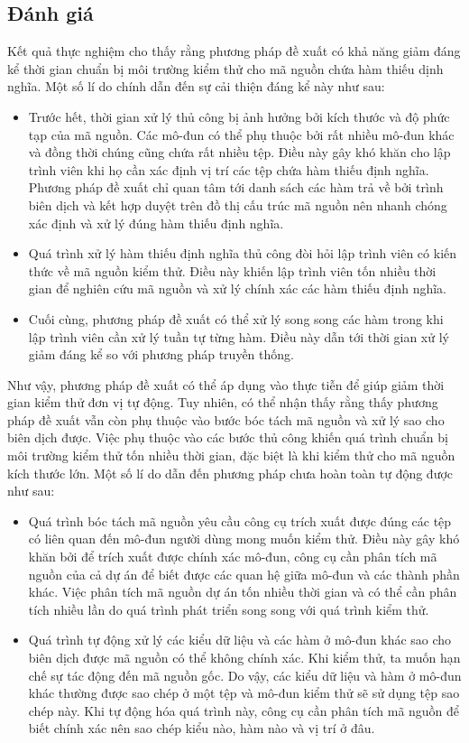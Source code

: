 \subsection{Đánh giá}
Kết quả thực nghiệm cho thấy rằng phương pháp đề xuất có khả năng giảm đáng kể thời gian chuẩn bị môi trường kiểm thử cho mã nguồn chứa hàm thiếu dịnh nghĩa. Một số lí do chính dẫn đến sự cải thiện đáng kể này như sau:
\begin{itemize}
    \item Trước hết, thời gian xử lý thủ công bị ảnh hưởng bởi kích thước và độ phức tạp của mã nguồn. Các mô-đun có thể phụ thuộc bởi rất nhiều mô-đun khác và đồng thời chúng cũng chứa rất nhiều tệp. Điều này gây khó khăn cho lập trình viên khi họ cần xác định vị trí các tệp chứa hàm thiếu định nghĩa. Phương pháp đề xuất chỉ quan tâm tới danh sách các hàm trả về bởi trình biên dịch và kết hợp duyệt trên đồ thị cấu trúc mã nguồn nên nhanh chóng xác định và xử lý đúng hàm thiếu định nghĩa.
    \item Quá trình xử lý hàm thiếu định nghĩa thủ công đòi hỏi lập trình viên có kiến thức về mã nguồn kiểm thử. Điều này khiến lập trình viên tốn nhiều thời gian để nghiên cứu mã nguồn và xử lý chính xác các hàm thiếu định nghĩa.
    \item Cuối cùng, phương pháp đề xuất có thể xử lý song song các hàm trong khi lập trình viên cần xử lý tuần tự từng hàm. Điều này dẫn tới thời gian xử lý giảm đáng kể so với phương pháp truyền thống.
\end{itemize}

 Như vậy, phương pháp đề xuất có thể áp dụng vào thực tiễn để giúp giảm thời gian kiểm thử đơn vị tự động. Tuy nhiên, có thể nhận thấy rằng thấy phương pháp đề xuất vẫn còn phụ thuộc vào bước bóc tách mã nguồn và xử lý sao cho biên dịch được. Việc phụ thuộc vào các bước thủ công khiến quá trình chuẩn bị môi trường kiểm thử tốn nhiều thời gian, đặc biệt là khi kiểm thử cho mã nguồn kích thước lớn. Một số lí do dẫn đến phương pháp chưa hoàn toàn tự động được như sau:
\begin{itemize}
    \item Quá trình bóc tách mã nguồn yêu cầu công cụ trích xuất được đúng các tệp có liên quan đến mô-đun người dùng mong muốn kiểm thử. Điều này gây khó khăn bởi để trích xuất được chính xác mô-đun, công cụ cần phân tích mã nguồn của cả dự án để biết được các quan hệ giữa mô-đun và các thành phần khác. Việc phân tích mã nguồn dự án tốn nhiều thời gian và có thể cần phân tích nhiều lần do quá trình phát triển song song với quá trình kiểm thử.
    \item Quá trình tự động xử lý các kiểu dữ liệu và các hàm ở mô-đun khác sao cho biên dịch được mã nguồn có thể không chính xác. Khi kiểm thử, ta muốn hạn chế sự tác động đến mã nguồn gốc. Do vậy, các kiểu dữ liệu và hàm ở mô-đun khác thường được sao chép ở một tệp và mô-đun kiểm thử sẽ sử dụng tệp sao chép này. Khi tự động hóa quá trình này, công cụ cần phân tích mã nguồn để biết chính xác nên sao chép kiểu nào, hàm nào và vị trí ở đâu.
\end{itemize}
 
